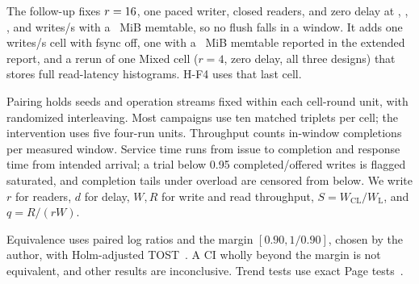 \documentclass[conference]{IEEEtran}
\begin{document}
The follow-up fixes $r=16{}$, one paced writer, closed readers, and zero delay at \FollowRateLow{}, \FollowRateSecond{}, \FollowRateThird{}, and \FollowRateHigh{} writes/s with a \FollowMemLarge{}~MiB memtable, so no flush falls in a window. It adds one \FollowRateHigh{} writes/s cell with fsync off, one with a \FollowMemSmall{}~MiB memtable reported in the extended report, and a rerun of one Mixed cell ($r=4$, zero delay, all three designs) that stores full read-latency histograms. H-F4 uses that last cell.

Pairing holds seeds and operation streams fixed within each cell-round unit, with randomized interleaving. Most campaigns use ten matched triplets per cell; the intervention uses five four-run units. Throughput counts in-window completions per measured window. Service time runs from issue to completion and response time from intended arrival; a trial below 0.95 completed/offered writes is flagged saturated, and completion tails under overload are censored from below. We write $r$ for readers, $d$ for delay, $W,R$ for write and read throughput, $S=W_{\mathrm{CL}}/W_{\mathrm{L}}$, and $q=R/(rW)$.

Equivalence uses paired log ratios and the margin $[0.90,1/0.90]$, chosen by the author, with Holm-adjusted TOST~\cite{schuirmann1987,lakens2017,holm1979}. A CI wholly beyond the margin is not equivalent, and other results are inconclusive. Trend tests use exact Page tests~\cite{page1963}.
\end{document}
